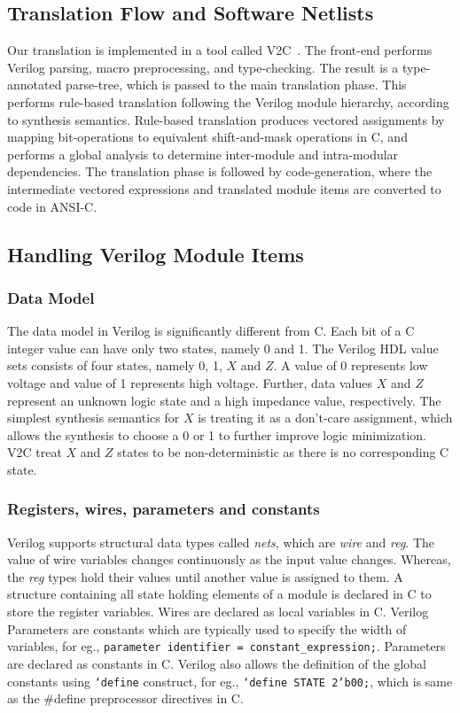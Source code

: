 \subsection{Translation Flow and Software Netlists}

Our translation is implemented in a tool called V2C~\cite{mtk2016}.  
The front-end performs Verilog parsing, macro preprocessing, and
type-checking. The result is a type-annotated parse-tree, which is passed to the main translation phase. 
This performs rule-based translation following the Verilog module hierarchy, 
according to synthesis semantics. Rule-based translation produces vectored
assignments by mapping bit-operations to equivalent shift-and-mask operations in C, and
performs a global analysis to determine inter-module and intra-modular
dependencies.  The translation phase is followed by code-generation, 
where the intermediate vectored expressions and translated module items
are converted to code in ANSI-C. 

%
\subsection{Handling Verilog Module Items}
%
\subsubsection{Data Model} The data model in Verilog is significantly 
different from C.  Each bit of a C integer value can have 
only two states, namely 0 and 1.  The Verilog HDL
value sets consists of four states, namely 0, 1, $X$ and $Z$.  A value of 0
represents low voltage and value of 1 represents high voltage.  Further,
data values $X$ and $Z$ represent an unknown logic state and a 
high impedance value, respectively.  The simplest synthesis semantics 
for $X$ is treating it as a don't-care assignment, which allows the 
synthesis to choose a 0 or 1 to further improve logic minimization.
V2C treat $X$ and $Z$ states to be non-deterministic as there is no
corresponding C state. 

\subsubsection{Registers, wires, parameters and constants} Verilog supports structural 
data types called \emph{nets}, which are \emph{wire}
and \emph{reg}. The value of wire variables changes 
continuously as the input value changes.  Whereas, 
the \emph{reg} types hold their values until another value is 
assigned to them.  A structure containing all state holding
elements of a module is declared in C to store the register
variables. Wires are declared as local variables in C.  
Verilog Parameters are constants which 
are typically used to specify the width of variables,
for eg., \texttt{parameter identifier = constant\_expression;}.
Parameters are declared as constants in C.  
Verilog also allows the definition of the global constants 
using \texttt{`define} construct, for eg., \texttt{`define STATE 2'b00;},
which is same as the \#define preprocessor directives in C.

